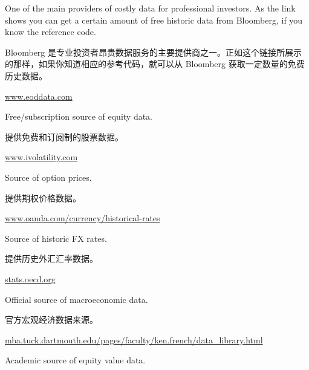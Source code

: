 \begin{englishblock} One of the main providers of costly data for professional investors. As the link shows you can get a certain amount of free historic data from Bloomberg, if you know the reference code. \end{englishblock}

\begin{chineseblock} Bloomberg 是专业投资者昂贵数据服务的主要提供商之一。正如这个链接所展示的那样，如果你知道相应的参考代码，就可以从 Bloomberg 获取一定数量的免费历史数据。\end{chineseblock}

\url{www.eoddata.com}

\begin{englishblock} Free/subscription source of equity data. \end{englishblock}

\begin{chineseblock}提供免费和订阅制的股票数据。\end{chineseblock}

\url{www.ivolatility.com}

\begin{englishblock} Source of option prices. \end{englishblock}

\begin{chineseblock}提供期权价格数据。\end{chineseblock}

\url{www.oanda.com/currency/historical-rates}

\begin{englishblock} Source of historic FX rates. \end{englishblock}

\begin{chineseblock}提供历史外汇汇率数据。\end{chineseblock}

\url{stats.oecd.org}

\begin{englishblock} Official source of macroeconomic data. \end{englishblock}

\begin{chineseblock}官方宏观经济数据来源。\end{chineseblock}

\url{mba.tuck.dartmouth.edu/pages/faculty/ken.french/data_library.html}

\begin{englishblock} Academic source of equity value data. \end{englishblock}

